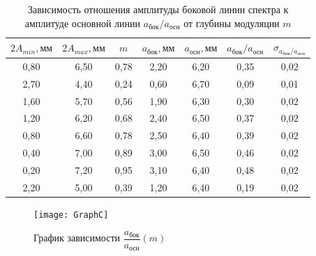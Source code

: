 \documentclass[a4paper, 12pt]{article}
\begin{document}
\begin{table}[H]
\centering
\caption{Зависимость отношения амплитуды боковой линии спектра к амплитуде основной линии $a_\text{бок}/a_\text{осн}$ от глубины модуляции $m$}
\begin{tabular}{|c|c|c|c|c|c|c|}
\hline
$2A_{min}, \text{мм}$ & $2A_{max}, \text{мм}$ & $m$  & $a_\text{бок}, \text{мм}$ & $a_\text{осн}, \text{мм}$ & $a_\text{бок}/a_\text{осн}$ & $\sigma_{a_\text{бок}/a_\text{осн}}$ \\ \hline
0,80                & 6,50                & 0,78 & 2,20                      & 6,20                      & 0,35                        & 0,02                               \\ \hline
2,70                & 4,40                & 0,24 & 0,60                      & 6,70                      & 0,09                        & 0,01                               \\ \hline
1,60                & 5,70                & 0,56 & 1,90                      & 6,30                      & 0,30                        & 0,02                               \\ \hline
1,20                & 6,20                & 0,68 & 2,40                      & 6,50                      & 0,37                        & 0,02                               \\ \hline
0,80                & 6,60                & 0,78 & 2,50                      & 6,40                      & 0,39                        & 0,02                               \\ \hline
0,40                & 7,00                & 0,89 & 3,00                      & 6,50                      & 0,46                        & 0,02                               \\ \hline
0,20                & 7,20                & 0,95 & 3,10                      & 6,40                      & 0,48                        & 0,02                               \\ \hline
2,20                & 5,00                & 0,39 & 1,20                      & 6,40                      & 0,19                        & 0,02                               \\ \hline
\end{tabular}
\end{table}

\begin{figure}[H]
\centering
\texttt{[image: GraphC]}
\caption{График зависимости $\dfrac{a_\text{бок}}{a_\text{осн}}(m)$}
\end{figure}
\end{document}
